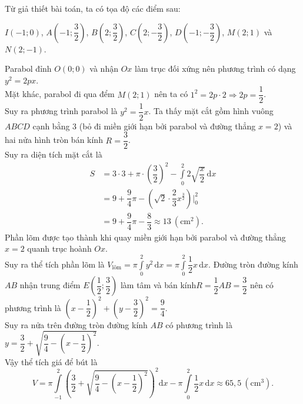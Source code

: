 \begin{ex}
{\begin{center}
		\end{center}
		\noindent Từ giả thiết bài toán, ta có tọa độ các điểm sau:\\
		\centerline{$I(-1;0)$, $A\left(-1;\dfrac{3}{2}\right)$, $B\left(2;\dfrac{3}{2}\right)$, $C\left(2;-\dfrac{3}{2}\right)$, $D(-1;-\dfrac{3}{2})$, $M(2;1)$ và $N(2;-1)$.}
		\begin{itemchoice}
			\itemch Parabol đỉnh $O(0;0)$ và nhận $Ox$ làm trục đối xứng nên phương trình có dạng $y^2=2px$.\\
			Mặt khác, parabol đi qua đểm $M(2;1)$ nên ta có $1^2=2p\cdot 2 \Rightarrow 2p=\dfrac{1}{2}$.\\
			Suy ra phương trình parabol là $y^2=\dfrac{1}{2}x$.
			\itemch Ta thấy mặt cắt gồm hình vuông $ABCD$ cạnh bằng $3$ (bỏ đi miền giới hạn bởi parabol và đường thẳng $x=2$) và hai nửa hình tròn bán kính $R=\dfrac{3}{2}$.\\
			Suy ra diện tích mặt cắt là
			\begin{align*}
				S&=3\cdot 3+\pi\cdot\left(\dfrac{3}{2}\right)^2-\displaystyle\int\limits_0^2 2\sqrt{\dfrac{x}{2}} \mathrm{\,d}x\\
				&=9+\dfrac{9}{4}\pi-\left( \sqrt{2}\cdot\dfrac{2}{3} x^{\frac{3}{2}} \right)\Bigg|_0^2\\
				&=9+\dfrac{9}{4}\pi-\dfrac{8}{3}\approx 13\ \left(\text{cm}^2\right).
			\end{align*}
			\itemch Phần lõm được tạo thành khi quay miền giới hạn bởi parabol và đường thẳng $x=2$ quanh trục hoành $Ox$. \\
			Suy ra thể tích phần lõm là $V_{\text{lõm}}=\pi \displaystyle\int\limits_0^2 y^2 \mathrm{\,d}x=\pi \int\limits_0^2 \dfrac{1}{2}x\mathrm{\,d}x$.
			\itemch Đường tròn đường kính $AB$ nhận trung điểm $E\left(\dfrac{1}{2};\dfrac{3}{2}\right)$ làm tâm và bán kính\break $R=\dfrac{1}{2}AB=\dfrac{3}{2}$ nên có phương trình là $\left(x-\dfrac{1}{2}\right)^2+\left(y-\dfrac{3}{2}\right)^2=\dfrac{9}{4}$.\\
			Suy ra nửa trên đường tròn đường kính $AB$ có phương trình là $y=\dfrac{3}{2}+\sqrt{\dfrac{9}{4}-\left(x-\dfrac{1}{2}\right)^2}$.\\
			Vậy thể tích giá để bút là 
			\[V=\displaystyle \pi
			\int\limits_{-1}^{2}\left(\dfrac{3}{2}+\sqrt{\dfrac{9}{4}-\left(x-\dfrac{1}{2}\right)^2}\right)^2\mathrm{d}x-\pi \int\limits_0^2 \dfrac{1}{2}x\mathrm{\,d}x \approx 65{,}5\ \left(\text{cm}^3\right).\]
		\end{itemchoice}
	}
\end{ex}

